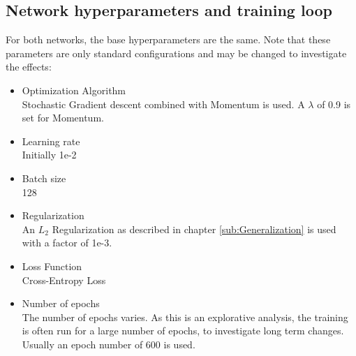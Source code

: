 \subsection{Network hyperparameters and training loop}\label{sub:Hyperparameters}
For both networks, the base hyperparameters are the same. Note that these
parameters are only standard configurations and may be changed to investigate
the effects:
\begin{itemize}
    \item Optimization Algorithm \\Stochastic Gradient descent combined with
    Momentum is used. A $\lambda$ of 0.9 is set for Momentum.
    \item Learning rate \\Initially 1e-2
    \item Batch size \\128
    \item Regularization \\An $L_2$ Regularization as described in chapter
    \ref{sub:Generalization} is used with a factor of 1e-3.
    \item Loss Function \\Cross-Entropy Loss
    \item Number of epochs \\The number of epochs varies. As this is an
    explorative analysis, the training is often run for a large number of
    epochs, to investigate long term changes. Usually an epoch number of 600 is
    used.
\end{itemize}

